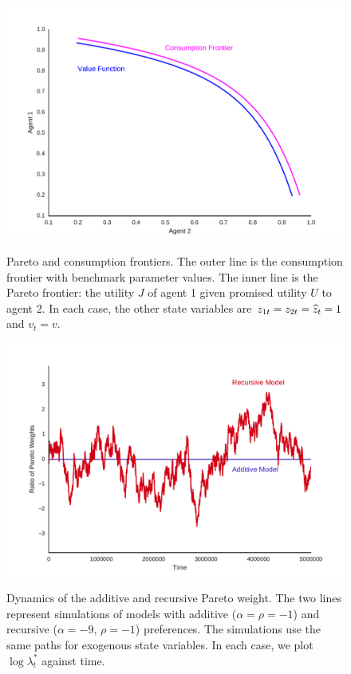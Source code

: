 \clearpage
\begin{figure}[htb]
\caption{Pareto and consumption frontiers.
The outer line is the consumption frontier with benchmark parameter values.
The inner line is the Pareto frontier:  the utility $J$ of agent 1 given
promised utility $U$ to agent 2.
In each case, the other state variables are $z_{1t} = z_{2t} = \widehat{z}_t = 1$
and $v_t = v$.}

\includegraphics[width=\textwidth]{images/BCFL/frontiers_alpha9.pdf}
\label{fig:pareto-frontier}
\end{figure}


\clearpage
\begin{figure}[htb]
\caption{Dynamics of the additive and recursive Pareto weight.
The two lines represent simulations of models with additive ($\alpha = \rho = -1$)
and recursive ($\alpha = -9$, $\rho = -1 $) preferences.
The simulations use the same paths for exogenous state variables.
In each case, we plot $\log \lambda_t^*$ against time. }

\includegraphics[width=\textwidth]{images/BCFL/paretoweightstability_alpha9.pdf}
\label{fig:exchange-pareto-weight-two}
\end{figure}


